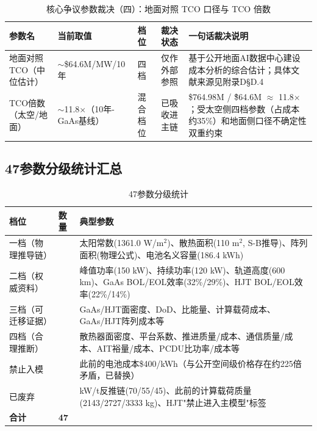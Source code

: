 \begin{table}[H]
  \centering
  \caption{核心争议参数裁决（四）：地面对照 TCO 口径与 TCO 倍数}
  \label{tab:core-verdicts-tco}
  \small
  \begin{tabularx}{\textwidth}{
    >{\raggedright\arraybackslash}p{2.7cm}
    >{\raggedright\arraybackslash}p{2.2cm}
    >{\centering\arraybackslash}p{1.5cm}
    >{\raggedright\arraybackslash}p{2.1cm}
    >{\raggedright\arraybackslash}X
  }
  \toprule
  \textbf{参数名} & \textbf{当前取值} & \textbf{档位} & \textbf{裁决状态} & \textbf{一句话裁决说明} \\
  \midrule
  地面对照TCO（中位估计） & $\sim$\$64.6M/MW/10年 & 四档 & 仅作外部参照 & 基于公开地面AI数据中心建设成本分析的综合估计；具体文献来源见附录D§D.4 \\
  TCO倍数（太空/地面） & $\sim$11.8$\times$（10年-GaAs基线） & 混合档位 & 已吸收进主链 & \$764.98M / \~\$64.6M $\approx$ 11.8$\times$；受太空侧四档参数（占成本约35\%）和地面侧口径不确定性双重约束 \\
  \bottomrule
  \end{tabularx}
\end{table}

\subsection{47参数分级统计汇总}

\begin{table}[H]
  \centering
  \caption{47参数分级统计}
  \label{tab:param-statistics}
  \small
  \begin{tabularx}{\textwidth}{
    >{\raggedright\arraybackslash}p{2.6cm}
    >{\centering\arraybackslash}p{1.2cm}
    >{\raggedright\arraybackslash}X
  }
  \toprule
  \textbf{档位} & \textbf{数量} & \textbf{典型参数} \\
  \midrule
  一档（物理推导链） & 5 & 太阳常数(1361.0 W/m$^2$)、散热面积(110 m$^2$, S-B推导)、阵列面积(物理公式)、电池名义容量(186.4 kWh) \\
  二档（权威资料） & 7 & 峰值功率(150 kW)、持续功率(120 kW)、轨道高度(600 km)、GaAs BOL/EOL效率(32\%/29\%)、HJT BOL/EOL效率(22\%/14\%) \\
  三档（可迁移证据） & 17 & GaAs/HJT面密度、DoD、比能量、计算载荷成本、GaAs/HJT阵列成本等 \\
  四档（合理推断） & 14 & 散热器面密度、平台系数、推进质量/成本、通信质量/成本、AIT裕量/成本、PCDU比功率/成本等 \\
  禁止入模 & 1 & 此前的电池成本\$400/kWh（与公开空间级价格存在约225倍矛盾，已替换） \\
  已废弃 & 3 & kW/t反推链(70/55/45)、此前的计算载荷质量(2143/2727/3333 kg)、HJT"禁止进入主模型"标签 \\
  \midrule
  \textbf{合计} & \textbf{47} & \\
  \bottomrule
  \end{tabularx}
\end{table}

